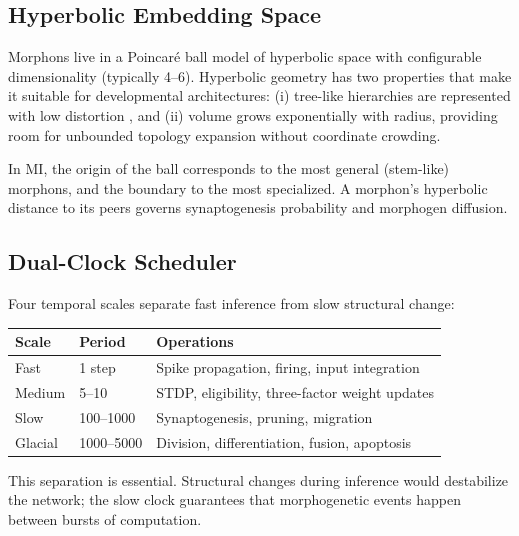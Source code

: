 \subsection{Hyperbolic Embedding Space}

Morphons live in a Poincaré ball model of hyperbolic space with configurable dimensionality (typically 4--6). Hyperbolic geometry has two properties that make it suitable for developmental architectures: (i) tree-like hierarchies are represented with low distortion \cite{nickel2017poincare}, and (ii) volume grows exponentially with radius, providing room for unbounded topology expansion without coordinate crowding.

In MI, the origin of the ball corresponds to the most general (stem-like) morphons, and the boundary to the most specialized. A morphon's hyperbolic distance to its peers governs synaptogenesis probability and morphogen diffusion.

\subsection{Dual-Clock Scheduler}

Four temporal scales separate fast inference from slow structural change:
\begin{center}
\begin{tabular}{lll}
\toprule
Scale & Period & Operations \\
\midrule
Fast    & 1 step    & Spike propagation, firing, input integration \\
Medium  & 5--10     & STDP, eligibility, three-factor weight updates \\
Slow    & 100--1000 & Synaptogenesis, pruning, migration \\
Glacial & 1000--5000 & Division, differentiation, fusion, apoptosis \\
\bottomrule
\end{tabular}
\end{center}
This separation is essential. Structural changes during inference would destabilize the network; the slow clock guarantees that morphogenetic events happen between bursts of computation.
